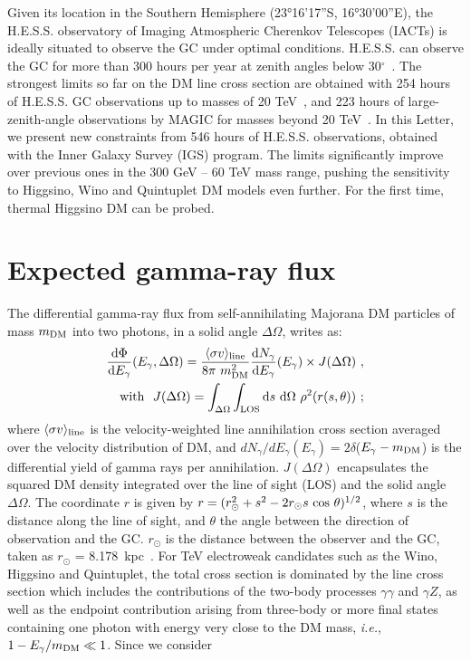 \documentclass[aps,prl,twocolumn,floats,balancelastpage,showpacs,showkeys,preprintnumbers,floatfix,nofootinbib,superscriptaddress, longbibliography]{revtex4-1}
\begin{document}
Given its location in the Southern Hemisphere (23°16'17''S, 16°30'00''E), the H.E.S.S. observatory of Imaging Atmospheric Cherenkov Telescopes (IACTs) is ideally situated to observe the GC
under optimal conditions. H.E.S.S. can observe the GC for more than 300 hours per year at zenith angles below 30$^\circ$~\textbf{\cite{realobs}}. The strongest limits so far on the DM line cross section are obtained with 254 hours of H.E.S.S. GC observations
up to masses of 20 TeV~\cite{Abdallah:2018qtu}, and 223 hours of large-zenith-angle observations by MAGIC for masses beyond 20 TeV~\cite{MAGIC:2022acl}. In this Letter, we present new constraints from 546 hours of H.E.S.S. observations, obtained with the Inner Galaxy Survey (IGS) program. The limits significantly improve over previous ones in the 300 GeV -- 60 TeV mass range,
pushing the sensitivity to Higgsino, Wino and Quintuplet DM models even further. For the first time, thermal Higgsino DM can be probed.

\section{Expected gamma-ray flux}
\label{sec:flux}

The differential gamma-ray flux from self-annihilating Majorana DM particles of mass $m_{\rm DM}$ into two photons, in a solid angle $\Delta\Omega$, writes as:
\begin{equation}
\begin{aligned}
\label{eq:promptflux}
\frac{{\rm d} \Phi}{{\rm d} E_{\gamma}} (E_{\gamma}, \Delta\Omega) = \frac{\langle \sigma v \rangle_{\rm line}}{8\pi \ m_{\rm DM}^2}
 \frac{{\rm d} N_\gamma}{{\rm d} E_{\gamma}}(E_{\gamma})\times J(\Delta\Omega) \ ,  \\
{\rm with} \, \, \, \,  J(\Delta\Omega)=\int_{\Delta\Omega}\int_{\rm LOS}{\rm d} s \ {\rm d} \Omega \ \rho^2(r(s,\theta))\ ;
 \end{aligned}
\end{equation}
where $\langle \sigma v\rangle_{\rm line}$ is the velocity-weighted line annihilation cross section averaged over the velocity distribution of DM, and $dN_\gamma/dE_\gamma(E_\gamma) = 2 \delta$($E_\gamma - m_{\rm DM}$) is the differential yield of gamma rays per annihilation. $J(\Delta\Omega)$ encapsulates the squared DM density integrated over the line of sight (LOS) and the solid angle $\Delta\Omega$.  The coordinate $r$ is given by $r = (r^2_{\odot}+s^2-2 r_{\odot} s\ {\rm cos}\ \theta)^{1/2}$, where $s$ is the distance along the line of sight, and $\theta$ the angle between the direction of observation and the GC. $r_{\odot}$ is the distance
between the observer
and the GC, taken as $r_{\odot}$ = 8.178~kpc~\cite{GRAVITY:2018ofz}. For TeV electroweak candidates such as the Wino, Higgsino and Quintuplet, the total cross section is dominated by the line cross section which includes the contributions of the two-body processes $\gamma\gamma$ and $\gamma Z$, as well as the endpoint contribution arising from three-body or more final states containing one photon with energy very close to the DM mass, \textit{i.e.}, $1-E_\gamma/m_{\rm DM}\ll1$. Since we consider
\end{document}

